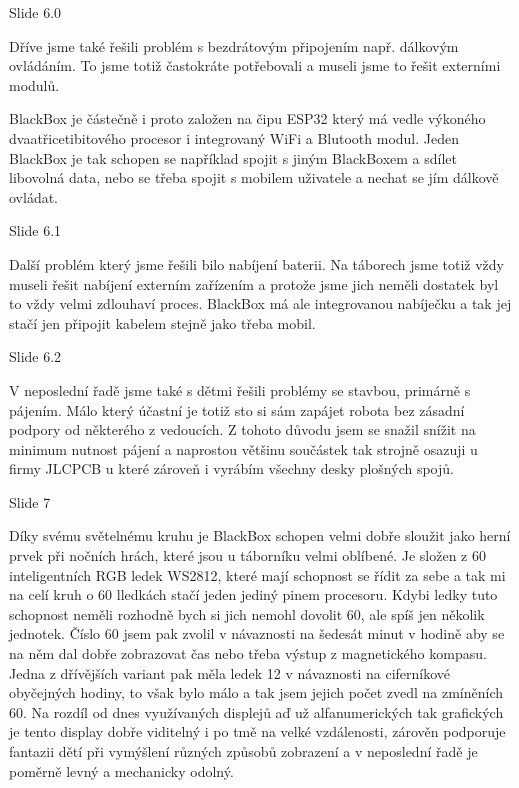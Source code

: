 
Slide 6.0

Dříve jsme také řešili problém s bezdrátovým připojením např. dálkovým ovládáním.
To jsme totiž častokráte potřebovali a museli jsme to řešit externími modulů.

BlackBox je částečně i proto založen na čipu ESP32 který má vedle výkoného dvaatřicetibitového procesor 
i integrovaný WiFi a Blutooth modul. 
Jeden BlackBox je tak schopen se například spojit s jiným BlackBoxem a sdílet libovolná data, 
nebo se třeba spojit s mobilem uživatele a nechat se jím dálkově ovládat. %

Slide 6.1
    
Další problém který jsme řešili bilo nabíjení baterii. Na táborech jsme totiž vždy museli
řešit nabíjení externím zařízením a protože jsme jich neměli dostatek byl to vždy velmi zdlouhaví proces.
BlackBox má ale integrovanou nabíječku a tak jej stačí jen připojit kabelem stejně jako třeba mobil.

Slide 6.2

V neposlední řadě jsme také s dětmi řešili problémy se stavbou, primárně s pájením. Málo který účastní 
je totiž sto si sám zapájet robota bez zásadní podpory od některého z vedoucích. Z tohoto důvodu jsem 
se snažil snížit na minimum nutnost pájení a naprostou většinu součástek tak strojně osazuji u firmy 
JLCPCB u které zároveň i vyrábím všechny desky plošných spojů.

Slide 7

Díky svému světelnému kruhu je BlackBox schopen velmi dobře sloužit jako herní prvek při nočních hrách,
které jsou u táborníku velmi oblíbené.
Je složen z 60 inteligentních RGB ledek WS2812, které mají schopnost se řídit za sebe a tak mi na celí kruh o 60 lledkách
stačí jeden jediný pinem procesoru. Kdybi ledky tuto schopnost neměli rozhodně bych si jich nemohl dovolit 60,
ale spíš jen několik jednotek. Číslo 60 jsem pak zvolil v návaznosti na šedesát 
minut v hodině aby se na něm dal dobře zobrazovat čas nebo třeba výstup z magnetického kompasu. 
Jedna z dřívějších variant pak měla ledek 12 v návaznosti na ciferníkové obyčejných hodiny,
to však bylo málo a tak jsem jejich počet zvedl na zmíněních 60.
Na rozdíl od dnes využívaných displejů aď už alfanumerických tak grafických je tento display dobře viditelný i po tmě na velké vzdálenosti, 
zárověn podporuje fantazii dětí při vymýšlení různých způsobů zobrazení a v neposlední řadě je poměrně levný a mechanicky odolný. %

